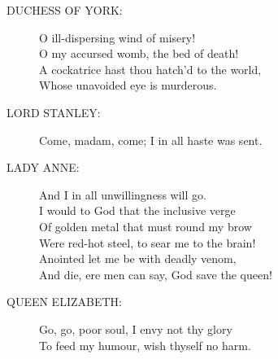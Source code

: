 \documentclass{article}
\begin{document}
\begin{description}
\item[DUCHESS OF YORK:] 
\hspace{1pt}O ill-dispersing wind of misery!\\
\hspace{1pt}O my accursed womb, the bed of death!\\
\hspace{1pt}A cockatrice hast thou hatch'd to the world,\\
\hspace{1pt}Whose unavoided eye is murderous.\\
\end{description}
\begin{description}
\item[LORD STANLEY:] 
\hspace{1pt}Come, madam, come; I in all haste was sent.\\
\end{description}
\begin{description}
\item[LADY ANNE:] 
\hspace{1pt}And I in all unwillingness will go.\\
\hspace{1pt}I would to God that the inclusive verge\\
\hspace{1pt}Of golden metal that must round my brow\\
\hspace{1pt}Were red-hot steel, to sear me to the brain!\\
\hspace{1pt}Anointed let me be with deadly venom,\\
\hspace{1pt}And die, ere men can say, God save the queen!\\
\end{description}
\begin{description}
\item[QUEEN ELIZABETH:] 
\hspace{1pt}Go, go, poor soul, I envy not thy glory\\
\hspace{1pt}To feed my humour, wish thyself no harm.\\
\end{description}
\end{document}
